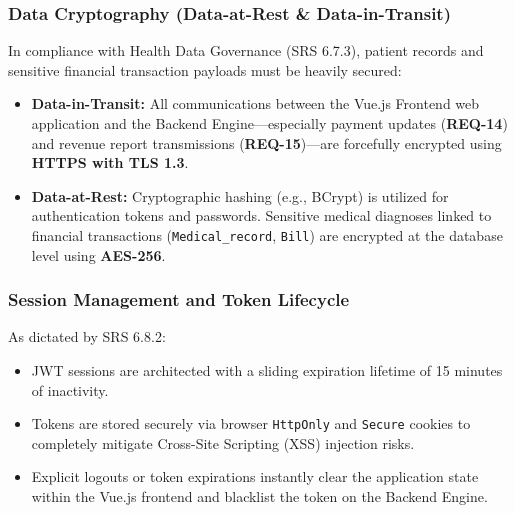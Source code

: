 \subsubsection{Data Cryptography (Data-at-Rest \& Data-in-Transit)}
In compliance with Health Data Governance (SRS 6.7.3), patient records and sensitive financial transaction payloads must be heavily secured:
\begin{itemize}
	\item \textbf{Data-in-Transit:} All communications between the Vue.js Frontend web application and the Backend Engine—especially payment updates (\textbf{REQ-14}) and revenue report transmissions (\textbf{REQ-15})—are forcefully encrypted using \textbf{HTTPS with TLS 1.3}.
	\item \textbf{Data-at-Rest:} Cryptographic hashing (e.g., BCrypt) is utilized for authentication tokens and passwords. Sensitive medical diagnoses linked to financial transactions (\texttt{Medical\_record}, \texttt{Bill}) are encrypted at the database level using \textbf{AES-256}.
\end{itemize}

\subsubsection{Session Management and Token Lifecycle}
As dictated by SRS 6.8.2:
\begin{itemize}
	\item JWT sessions are architected with a sliding expiration lifetime of 15 minutes of inactivity. 
	\item Tokens are stored securely via browser \texttt{HttpOnly} and \texttt{Secure} cookies to completely mitigate Cross-Site Scripting (XSS) injection risks. 
	\item Explicit logouts or token expirations instantly clear the application state within the Vue.js frontend and blacklist the token on the Backend Engine.
\end{itemize}

